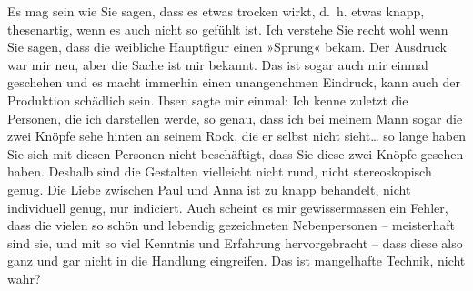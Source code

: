 \pstart
           Es mag sein wie Sie sagen, dass es etwas trocken wirkt, d. h. etwas knapp,
               thesenartig, wenn es auch nicht so gefühlt ist. Ich verstehe Sie recht wohl wenn Sie
               sagen, dass die weibliche Hauptfigur einen »Sprung« bekam. Der Ausdruck war mir neu,
               aber die Sache ist mir bekannt. Das ist sogar auch mir einmal geschehen und es macht
               immerhin einen unangenehmen Eindruck, kann auch der Produktion schädlich sein. Ibsen sagte mir einmal: Ich kenne zuletzt die
               Personen, die ich darstellen werde, so genau, dass
               ich bei meinem Mann sogar die zwei Knöpfe sehe hinten an seinem Rock, die er selbst
               nicht sieht{\dots} so lange haben Sie sich mit diesen Personen
               nicht beschäftigt, dass Sie diese zwei Knöpfe gesehen haben. Deshalb sind die
               Gestalten vielleicht nicht rund, nicht stereoskopisch genug. Die Liebe zwischen Paul
               und Anna ist zu knapp behandelt, nicht individuell genug, nur indiciert. Auch scheint
               es mir gewissermassen ein Fehler, dass die vielen so schön und lebendig gezeichneten
               Nebenpersonen – meisterhaft sind sie, und mit so viel Kenntnis und Erfahrung
               hervorgebracht – dass diese also ganz und gar nicht in die Handlung eingreifen. Das
               ist mangelhafte Technik, nicht wahr?\pend
           
